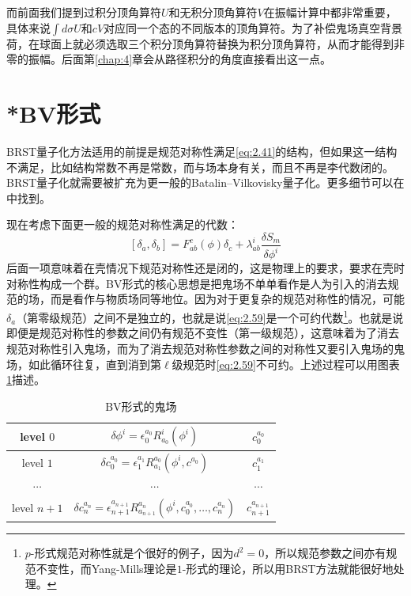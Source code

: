 而前面我们提到过积分顶角算符$U$和无积分顶角算符$V$在振幅计算中都非常重要，具体来说$\int d\sigma U$和$cV$对应同一个态的不同版本的顶角算符。为了补偿鬼场真空背景荷，在球面上就必须选取三个积分顶角算符替换为积分顶角算符，从而才能得到非零的振幅。后面第\ref{chap:4}章会从路径积分的角度直接看出这一点。
\section{*BV形式}
BRST量子化方法适用的前提是规范对称性满足\ref{eq:2.41}的结构，但如果这一结构不满足，比如结构常数不再是常数，而与场本身有关，而且不再是李代数闭的。BRST量子化就需要被扩充为更一般的Batalin–Vilkovisky量子化。更多细节可以在\cite{Weinberg:1996kr,Erbin:2021smf,Henneaux:1994lbw}中找到。

现在考虑下面更一般的规范对称性满足的代数：
\begin{equation}
	\label{eq:2.59}
	[\delta_a,\delta_b]=F_{ab}^c(\phi)\delta_c+\lambda_{ab}^i\frac{\delta S_m}{\delta \phi^i}
\end{equation}
后面一项意味着在壳情况下规范对称性还是闭的，这是物理上的要求，要求在壳时对称性构成一个群。BV形式的核心思想是把鬼场不单单看作是人为引入的消去规范的场，而是看作与物质场同等地位。因为对于更复杂的规范对称性的情况，可能$\delta_a$（第零级规范）之间不是独立的，也就是说\ref{eq:2.59}是一个可约代数\footnote{$p$-形式规范对称性就是个很好的例子，因为$d^2=0$，所以规范参数之间亦有规范不变性，而Yang-Mills理论是$1$-形式的理论，所以用BRST方法就能很好地处理。}。也就是说即便是规范对称性的参数之间仍有规范不变性（第一级规范），这意味着为了消去规范对称性引入鬼场，而为了消去规范对称性参数之间的对称性又要引入鬼场的鬼场，如此循环往复，直到消到第$\ell$级规范时\ref{eq:2.59}不可约。上述过程可以用图表\ref{tab:1}描述。
\begin{table}[htbp]
	\centering
	\begin{tabular}{ccc}
		\hline %
		level $0$ & $\delta\phi^i=\epsilon_0^{a_0}R_{a_0}^i(\phi^i)$ & $c_0^{a_0}$ \\ 
		\hline %
		level $1$ & $\delta c_0^{a_0}=\epsilon_1^{a_1}R_{a_1}^{a_0}(\phi^i,c^{a_0})$ & $c_1^{a_1}$ \\ 
		\hline
		$\cdots$ & $\cdots $ & $\cdots$\\
		\hline
		level $n+1$ & $\delta c_n^{a_n}=\epsilon_{n+1}^{a_{n+1}}R_{a_{n+1}}^{a_n}(\phi^i,c_0^{a_0},\ldots,c_n^{a_n})$ & $c_{n+1}^{a_{n+1}}$ \\ 
		\hline %
	\end{tabular}
	\caption{BV形式的鬼场}
	\label{tab:1}
\end{table}

